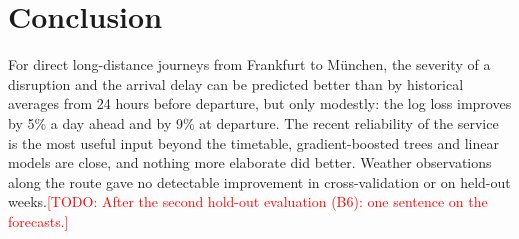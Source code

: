\documentclass[conference]{IEEEtran}
\newcommand{\todo}[1]{\textcolor{red}{[TODO: #1]}}
\begin{document}
\section{Conclusion}

For direct long-distance journeys from Frankfurt to M\"unchen, the severity of a disruption and the
arrival delay can be predicted better than by historical averages from 24 hours before departure,
but only modestly: the log loss improves by 5\% a day ahead and by 9\% at departure. The recent
reliability of the service is the most useful input beyond the timetable, gradient-boosted trees and
linear models are close, and nothing more elaborate did better. Weather observations along the route
gave no detectable improvement in cross-validation or on held-out weeks.\todo{After the second hold-out evaluation (B6): one
sentence on the forecasts.}



\end{document}
